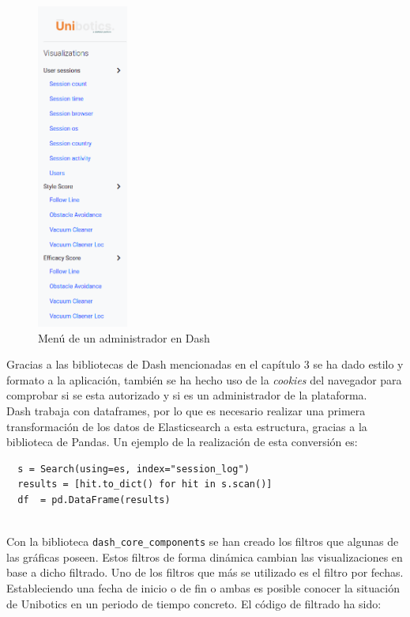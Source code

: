 \begin{figure}[H]
    \centering
    \includegraphics[width=3cm, keepaspectratio]{img/menu.png}
    \caption{Menú de un administrador en Dash}
    \label{fig:menu}
\end{figure}

\newpage
Gracias a las bibliotecas de Dash mencionadas en el capítulo 3 se ha dado estilo y formato a la aplicación, también se ha hecho uso de la \textit{cookies }del navegador para comprobar si se esta autorizado y si es un administrador de la plataforma.\\

Dash trabaja con dataframes, por lo que es necesario realizar una primera transformación de los datos de Elasticsearch a esta estructura, gracias a la biblioteca de Pandas. Un ejemplo de la realización de esta conversión es:

{\footnotesize
\begin{verbatim}
  s = Search(using=es, index="session_log")
  results = [hit.to_dict() for hit in s.scan()]
  df  = pd.DataFrame(results)
\end{verbatim}
}
\\

Con la biblioteca \texttt{dash\_core\_components} se han creado los filtros que algunas de las gráficas poseen. Estos filtros de forma dinámica cambian las visualizaciones en base a dicho filtrado. Uno de los filtros que más se utilizado es el filtro por fechas. Estableciendo una fecha de inicio o de fin o ambas es posible conocer la situación de Unibotics en un periodo de tiempo concreto. El código de filtrado ha sido:

